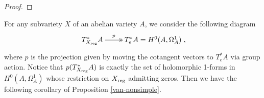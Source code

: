 \documentclass[a4paper,12pt,reqno]{amsart}
\theoremstyle{plain}
\theoremstyle{definition}
\theoremstyle{remark}
\begin{document}
\begin{proof}
%
%

\end{proof}

For any subvariety $X$ of an abelian variety $A$, we consider the following diagram 
$$\xymatrix{
T^*_{X_{\textnormal{reg}}}A\ar@{->>}[r]^-p& T^*_e A=H^0(A, \Omega_A^1)
},$$ where $p$ is the projection given by moving the cotangent vectors to $T^*_eA$ via group action. Notice that $p(T^*_{X_{\textnormal{reg}}}A)$ is exactly the set of holomorphic 1-forms in $H^0(A, \Omega_A^1)$ whose restriction on $X_{\textnormal{reg}}$ admitting zeros. Then we have the following corollary of Proposition \ref{van-nonsimple}.
\end{document}
